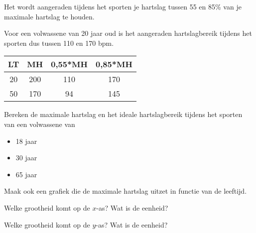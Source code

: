 Het wordt aangeraden tijdens het sporten je hartslag tussen 55 en 85\% van je maximale hartslag te houden. 

Voor een volwassene van 20 jaar oud is het aangeraden hartslagbereik tijdens het sporten dus tussen 110 en 170 bpm.

\begin{table}
	\centering
	\begin{tabular}{c|ccc}
		LT & MH & 0,55*MH & 0,85*MH \\
		\hline
		20 & 200 & 110 & 170 \\
		50 & 170 & 94 & 145 
	\end{tabular}
\end{table}

\begin{oef}
Bereken de maximale hartslag en het ideale hartslagbereik tijdens het sporten van een volwassene van 
\begin{itemize}
	\item 18 jaar
	\item 30 jaar
	\item 65 jaar
\end{itemize}
\end{oef}

\begin{oef}Maak ook een grafiek die de maximale hartslag uitzet in functie van de leeftijd. 

Welke grootheid komt op de $x$-as? Wat is de eenheid? 

Welke grootheid komt op de $y$-as? Wat is de eenheid?
\end{oef}

